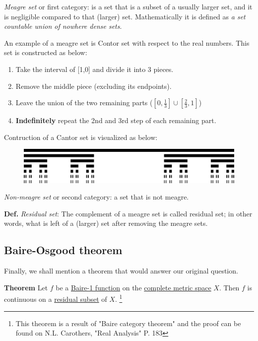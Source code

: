 \documentclass[11pt]{article}
\begin{document}
\emph{Meagre set} or first category: is a set that is a subset of a usually larger set, and it is negligible compared to that (larger) set.
Mathematically it is defined as \emph{a set countable union of nowhere dense sets}.

An example of a meagre set is Contor set with respect to the real numbers.
This set is constructed as below:

\begin{enumerate}
\item Take the interval of [1,0] and divide it into 3 pieces.
\item Remove the middle piece (excluding its endpoints).
\item Leave the union of the two remaining parts (\([0,\frac{1}{3}] \cup [\frac{2}{3},1]\))
\item \textbf{Indefinitely} repeat the 2nd and 3rd step of each remaining part.
\end{enumerate}

Contruction of a Cantor set is visualized as below:

\begin{figure}[htbp]
\centering
\includegraphics[width=.9\linewidth]{./img/figure3.png}
\caption{\label{fig:org4ec4361}}
\end{figure}

\emph{Non-meagre set} or second category: a set that is not meagre.

\textbf{Def.} \emph{Residual set}: The complement of a meagre set is called residual set; in other words, what is left of a (larger) set after removing the meagre sets. 

\subsection{Baire-Osgood theorem}
\label{sec:org74da49f}

Finally, we shall mention a theorem that would answer our original question.

\textbf{Theorem} Let \(f\) be a \uline{Baire-1 function} on the \uline{complete metric space} \(X\). Then \(f\) is continuous on a \uline{residual subset} of \(X\).
\footnote{This theorem is a result of "Baire category theorem" and the proof can be found on N.L. Carothers, "Real Analysis" P. 183}
\end{document}
